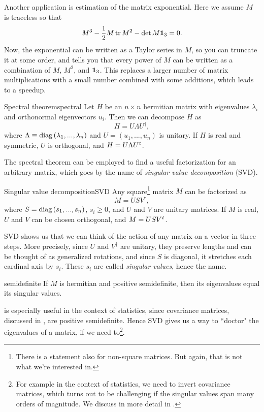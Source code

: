 Another application is estimation of the matrix exponential.
Here we assume $M$ is traceless so that
\begin{equation}\label{eq:Mestimate}
M^3-\frac{1}{2}M\tr M^2-\det M  {\mathbf 1}_3=0.
\end{equation}
Now, the exponential can be written as a Taylor series in $M$,
so you can truncate it at some order, and  tells you that
every power of $M$ can be written as a combination of $M$, $M^2$, and ${\mathbf 1}_3$.
This replaces a larger number of matrix multiplications with a small number
combined with some additions, which leads to a speedup.

\begin{theorem}{Spectral theorem}{spectral}
Let $H$ be an $n\times n$ hermitian matrix with
eigenvalues $\lambda_i$ and orthonormal eigenvectors $u_i$. Then
we can decompose $H$ as
$$
H=U\Lambda U^\dagger,
$$
where $\Lambda\equiv\mathop{\mathrm{diag}}\left(\lambda_1,...,\lambda_n\right)$ and
$U=\left(u_1,...,u_n\right)$ is unitary. If $H$ is real and symmetric,
$U$ is orthogonal, and $H=U\Lambda\trans{U}$.
\end{theorem}

The spectral theorem can be employed to find a useful
factorization for an arbitrary matrix, which goes by
the name of 
{\it singular value decomposition} (SVD).
\begin{theorem}{Singular value decomposition}{SVD}
Any square\footnote{There is a statement also for non-square matrices.
But again, that is not what we're interested in.}
matrix $M$ can be factorized as
$$
M=USV^\dagger,
$$
where $S=\mathop{\mathrm{diag}}\left(s_1,...,s_n\right)$, $s_i\geq 0$,
and $U$ and $V$ are unitary matrices. If $M$ is real, $U$ and $V$
can be chosen orthogonal, and $M=US\trans{V}$.
\end{theorem}
SVD shows us that we can think of the action of any matrix on a vector
in three steps. More precisely, since $U$ and
$V^\dagger$ are unitary, they preserve lengths and can be thought of
as generalized rotations, and since $S$ is diagonal, it stretches each cardinal axis
by $s_i$. These $s_i$ are called {\it singular values},
hence the name.

\begin{proposition}{}{semidefinite}
If $M$ is hermitian and positive semidefinite, then its eigenvalues equal its singular values.
\end{proposition}

 is especially useful in the context of statistics,
since covariance matrices, discussed in , are
positive semidefinite. Hence SVD gives us a way to ``doctor" the eigenvalues
of a matrix, if we need to\footnote{For example in the context of statistics,
we need to invert covariance matrices, which turns out to be challenging if
the singular values span many orders of magnitude. 
We discuss in more detail in .}. 

